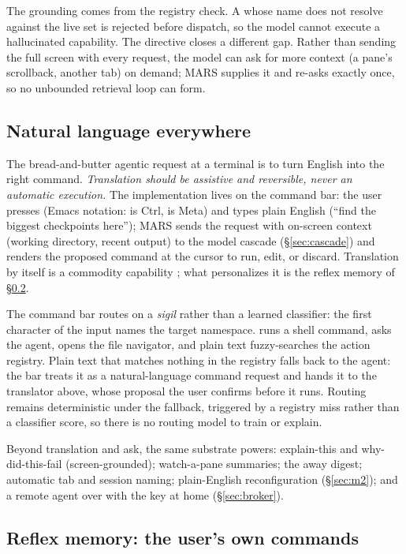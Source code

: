 The grounding comes from the registry check. A  whose name does not resolve
against the live  set is rejected before dispatch, so the model cannot
execute a hallucinated capability. The  directive closes a different gap. Rather than
sending the full screen with every request, the model can ask for more context (a pane's
scrollback, another tab) on demand; MARS supplies it and re-asks exactly once, so no
unbounded retrieval loop can form.

\subsection{Natural language everywhere}
\label{sec:translate}

The bread-and-butter agentic request at a terminal is to turn English into the right
command. \emph{Translation should be assistive and reversible, never an automatic
execution.} The implementation lives on the command bar: the user presses
 (Emacs notation:  is Ctrl,  is Meta) and types
plain English (``find the biggest checkpoints here''); MARS sends the request with on-screen context (working directory, recent output) to
the model cascade (\S\ref{sec:cascade}) and renders the proposed command at the cursor
to run, edit, or discard. Translation by itself is a commodity
capability \citep{lin2018nl2bash,lin2017tellina}; what personalizes it is the reflex
memory of \S\ref{sec:m1}.

The command bar routes on a \emph{sigil} rather than a learned classifier: the first
character of the input names the target namespace. \code{!} runs a shell command,
 asks the agent,  opens the file navigator, and plain text
fuzzy-searches the action registry. Plain text that matches nothing in the registry
falls back to the agent: the bar treats it as a natural-language command request and
hands it to the translator above, whose proposal the user confirms
before it runs. Routing remains deterministic under the fallback, triggered by a
registry miss rather than a classifier score, so there is no routing model to train or
explain.

Beyond translation and ask, the same substrate powers: explain-this and
why-did-this-fail (screen-grounded); watch-a-pane summaries; the away digest;
automatic tab and session naming; plain-English reconfiguration (\S\ref{sec:m2}); and
a remote agent over  with the key at home (\S\ref{sec:broker}).

\subsection{Reflex memory: the user's own commands}
\label{sec:m1}

